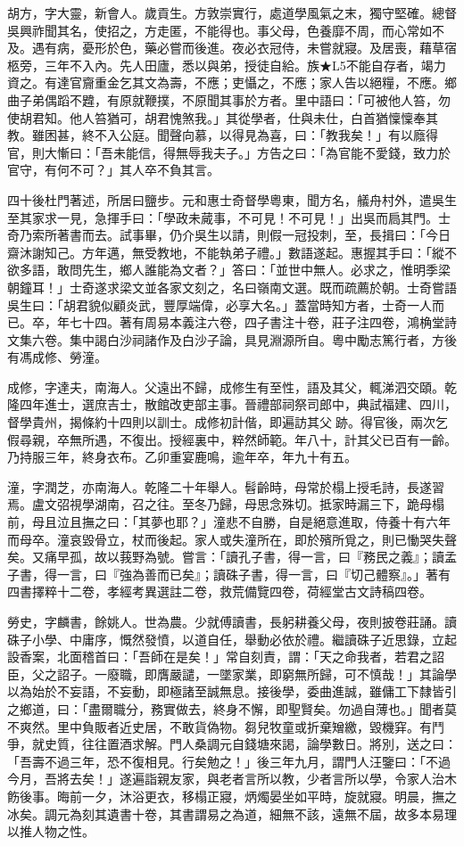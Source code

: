 \begin{pinyinscope}
胡方，字大靈，新會人。歲貢生。方敦崇實行，處道學風氣之末，獨守堅確。總督吳興祚聞其名，使招之，方走匿，不能得也。事父母，色養靡不周，而心常如不及。遇有病，憂形於色，藥必嘗而後進。夜必衣冠侍，未嘗就寢。及居喪，藉草宿柩旁，三年不入內。先人田廬，悉以與弟，授徒自給。族★L5不能自存者，竭力資之。有達官齎重金乞其文為壽，不應；吏懾之，不應；家人告以絕糧，不應。鄉曲子弟偶蹈不韙，有原就鞭撲，不原聞其事於方者。里中語曰：「可被他人笞，勿使胡君知。他人笞猶可，胡君愧煞我。」其從學者，仕與未仕，白首猶懍懍奉其教。雖困甚，終不入公庭。聞聲向慕，以得見為喜，曰：「教我矣！」有以廕得官，則大慚曰：「吾未能信，得無辱我夫子。」方告之曰：「為官能不愛錢，致力於官守，有何不可？」其人卒不負其言。

四十後杜門著述，所居曰鹽步。元和惠士奇督學粵東，聞方名，艤舟村外，遣吳生至其家求一見，急揮手曰：「學政未蕆事，不可見！不可見！」出吳而扃其門。士奇乃索所著書而去。試事畢，仍介吳生以請，則假一冠投刺，至，長揖曰：「今日齋沐謝知己。方年邁，無受教地，不能執弟子禮。」數語遂起。惠握其手曰：「縱不欲多語，敢問先生，鄉人誰能為文者？」答曰：「並世中無人。必求之，惟明季梁朝鐘耳！」士奇遂求梁文並各家文刻之，名曰嶺南文選。既而疏薦於朝。士奇嘗語吳生曰：「胡君貌似顧炎武，豐厚端偉，必享大名。」蓋當時知方者，士奇一人而已。卒，年七十四。著有周易本義注六卷，四子書注十卷，莊子注四卷，鴻桷堂詩文集六卷。集中謁白沙祠諸作及白沙子論，具見淵源所自。粵中勵志篤行者，方後有馮成修、勞潼。

成修，字達夫，南海人。父遠出不歸，成修生有至性，語及其父，輒涕泗交頤。乾隆四年進士，選庶吉士，散館改吏部主事。晉禮部祠祭司郎中，典試福建、四川，督學貴州，揭條約十四則以訓士。成修初計偕，即遍訪其父跡。得官後，兩次乞假尋親，卒無所遇，不復出。授經裏中，粹然師範。年八十，計其父已百有一齡。乃持服三年，終身衣布。乙卯重宴鹿鳴，逾年卒，年九十有五。

潼，字潤芝，亦南海人。乾隆二十年舉人。髫齡時，母常於榻上授毛詩，長遂習焉。盧文弨視學湖南，召之往。至冬乃歸，母思念殊切。抵家時漏三下，跪母榻前，母且泣且撫之曰：「其夢也耶？」潼悲不自勝，自是絕意進取，侍養十有六年而母卒。潼哀毀骨立，杖而後起。家人或失潼所在，即於殯所覓之，則已慟哭失聲矣。又痛早孤，故以莪野為號。嘗言：「讀孔子書，得一言，曰『務民之義』；讀孟子書，得一言，曰『強為善而已矣』；讀硃子書，得一言，曰『切己體察』。」著有四書擇粹十二卷，孝經考異選註二卷，救荒備覽四卷，荷經堂古文詩稿四卷。

勞史，字麟書，餘姚人。世為農。少就傅讀書，長躬耕養父母，夜則披卷莊誦。讀硃子小學、中庸序，慨然發憤，以道自任，舉動必依於禮。繼讀硃子近思錄，立起設香案，北面稽首曰：「吾師在是矣！」常自刻責，謂：「天之命我者，若君之詔臣，父之詔子。一廢職，即膺嚴譴，一墜家業，即窮無所歸，可不慎哉！」其論學以為始於不妄語，不妄動，即極諸至誠無息。接後學，委曲進誠，雖傭工下隸皆引之鄉道，曰：「盡爾職分，務實做去，終身不懈，即聖賢矣。勿過自薄也。」聞者莫不爽然。里中負販者近史居，不敢貨偽物。芻兒牧童或折棄矰繳，毀機穽。有鬥爭，就史質，往往置酒求解。門人桑調元自錢塘來謁，論學數日。將別，送之曰：「吾壽不過三年，恐不復相見。行矣勉之！」後三年九月，謂門人汪鑒曰：「不過今月，吾將去矣！」遂遍詣親友家，與老者言所以教，少者言所以學，令家人治木飭後事。晦前一夕，沐浴更衣，移榻正寢，炳燭晏坐如平時，旋就寢。明晨，撫之冰矣。調元為刻其遺書十卷，其書謂易之為道，細無不該，遠無不屆，故多本易理以推人物之性。


\end{pinyinscope}
